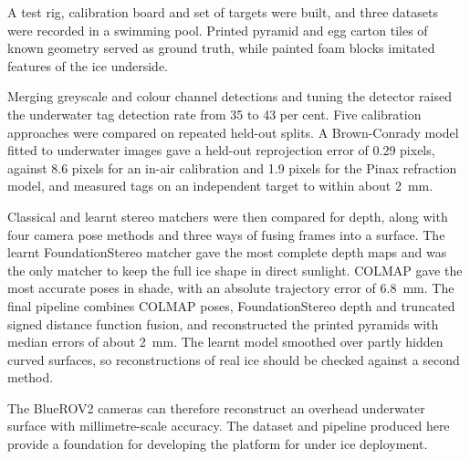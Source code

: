 A test rig, calibration board and set of targets were built, and three datasets were recorded in a swimming pool.
Printed pyramid and egg carton tiles of known geometry served as ground truth, while painted foam blocks imitated
features of the ice underside.

Merging greyscale and colour channel detections and tuning the detector raised the underwater tag detection rate
from 35 to 43 per cent. Five calibration approaches were compared on repeated held-out splits. A Brown-Conrady
model fitted to underwater images gave a held-out reprojection error of 0.29 pixels, against 8.6 pixels for an
in-air calibration and 1.9 pixels for the Pinax refraction model, and measured tags on an independent target to
within about 2~mm.

Classical and learnt stereo matchers were then compared for depth, along with four camera pose methods and three
ways of fusing frames into a surface. The learnt FoundationStereo matcher gave the most complete depth maps and was
the only matcher to keep the full ice shape in direct sunlight. COLMAP gave the most accurate poses in shade, with
an absolute trajectory error of 6.8~mm. The final pipeline combines COLMAP poses, FoundationStereo depth and
truncated signed distance function fusion, and reconstructed the printed pyramids with median errors of about
2~mm. The learnt model smoothed over partly hidden curved surfaces, so reconstructions of real ice should be checked
against a second method.

The BlueROV2 cameras can therefore reconstruct an overhead underwater surface with millimetre-scale accuracy. The
dataset and pipeline produced here provide a foundation for developing the platform for under ice deployment.
